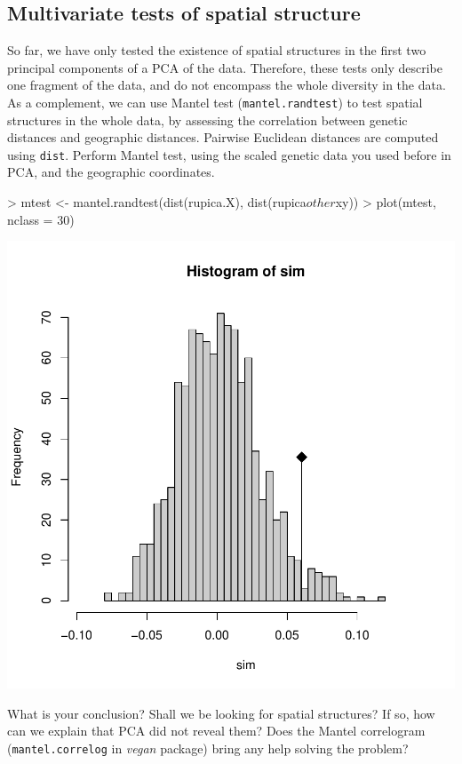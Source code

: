 \documentclass{article}
\begin{document}
\subsection{Multivariate tests of spatial structure}
So far, we have only tested the existence of spatial structures in the first two principal components
of a PCA of the data.
Therefore, these tests only describe one fragment of the data, and do not encompass the whole
diversity in the data.
As a complement, we can use Mantel test (\texttt{mantel.randtest}) to test spatial structures in the
whole data, by assessing the correlation between genetic distances and geographic distances.
Pairwise Euclidean distances are computed using \texttt{dist}.
Perform Mantel test, using the scaled genetic data you used before in PCA, and the geographic coordinates.
\begin{Schunk}
\begin{Sinput}
> mtest <- mantel.randtest(dist(rupica.X), dist(rupica$other$xy))
> plot(mtest, nclass = 30)
\end{Sinput}
\end{Schunk}
\includegraphics{figs/spca-041}

\noindent What is your conclusion? Shall we be looking for spatial structures?
If so, how can we explain that PCA did not reveal them?
Does the Mantel correlogram (\texttt{mantel.correlog} in \emph{vegan} package) bring any help solving the problem?
\end{document}
